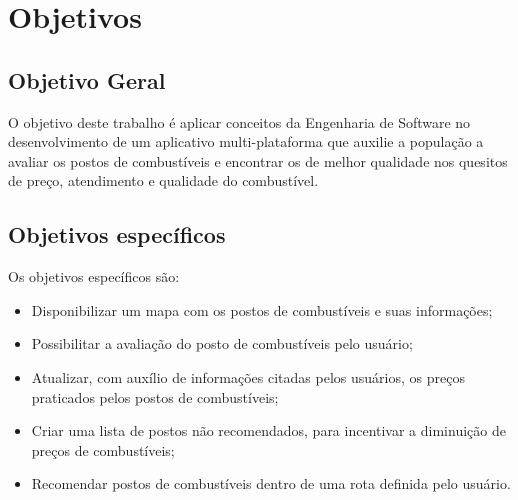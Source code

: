 \section{Objetivos}

\subsection{Objetivo Geral}

O objetivo deste trabalho é aplicar conceitos da Engenharia de Software no desenvolvimento de um aplicativo multi-plataforma que auxilie a população a avaliar os postos de combustíveis e encontrar os de melhor qualidade nos quesitos de preço, atendimento e qualidade do combustível.

\subsection{Objetivos específicos}

Os objetivos específicos são:
\begin{itemize}
    \item Disponibilizar um mapa com os postos de combustíveis e suas informações;
    \item Possibilitar a avaliação do posto de combustíveis pelo usuário;
    \item Atualizar, com auxílio de informações citadas pelos usuários, os preços praticados pelos postos de combustíveis;
    \item Criar uma lista de postos não recomendados, para incentivar a diminuição de preços de combustíveis;
    \item Recomendar postos de combustíveis dentro de uma rota definida pelo usuário.
\end{itemize}

